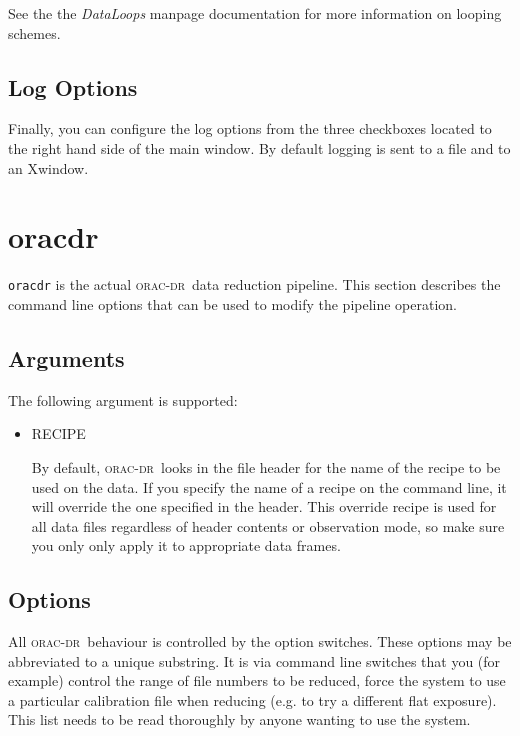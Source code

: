 \documentclass[twoside,11pt]{article}
\renewcommand{\_}{\texttt{\symbol{95}}}
\newcommand{\oracdr}{\textsc{orac-dr}}
\begin{document}
See the the \emph{DataLoops} manpage documentation for more information on looping
schemes.

\subsection*{Log Options\label{Xoracdr_LOG_OPTIONS}}

Finally, you can configure the log options from the three checkboxes
located to the right hand side of the main window. By default logging
is sent to a file and to an Xwindow.

\section{oracdr\label{oracdr}}

\texttt{oracdr} is the actual \oracdr\ data reduction pipeline. 
This section describes the command line options that
can be used to modify the pipeline operation.

\subsection*{Arguments\label{oracdr_Arguments}}

The following argument  is  supported:

\begin{itemize}
\item RECIPE

By default, \oracdr\ looks in the file header for the name of the
recipe to be used on the data. If you specify the name of a recipe on
the command line, it will override the one specified in the
header. This override recipe is used for all data files regardless of
header contents or observation mode, so make sure you only only apply
it to appropriate data frames.

\end{itemize}
\subsection*{Options\label{oracdr_Options}}

All \oracdr\ behaviour is controlled by the option
switches. These options may be abbreviated to a unique substring. It
is via command line switches that you (for example) control the range
of file numbers to be reduced, force the system to use a particular
calibration file when reducing (e.g. to try a different flat
exposure). This list needs to be read thoroughly by anyone wanting to
use the system.
\end{document}

